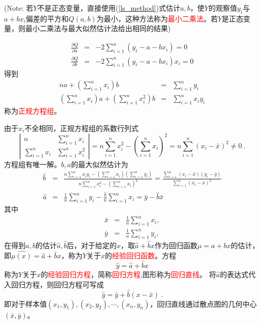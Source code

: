 \documentclass[12pt,a4paper]{article}
\begin{document}
(Note: 若$Y$不是正态变量，直接使用(\ref{ls_method})式估计$a, b$，使$Y$的观察值$y_i$与$a+bx_i$偏差的平方和$Q(a, b)$为最小，这种方法称为\textcolor{red}{最小二乘法}。若$Y$是正态变量，则最小二乘法与最大似然估计法给出相同的结果)

\begin{eqnarray}
\nonumber \frac{\partial Q}{\partial a} &=& -2\sum_{i=1}^n (y_i -a -bx_i) = 0 \\
\frac{\partial Q}{\partial b} &=& -2\sum_{i=1}^n (y_i -a -bx_i) x_i = 0
\end{eqnarray}
得到
\begin{eqnarray}
\nonumber na + \left(\sum_{i=1}^n x_i \right) b &=& \sum_{i=1}^n y_i \\
\left( \sum_{i=1}^n x_i \right) a + \left(\sum_{i=1}^n x^2_i \right) b &=& \sum_{i=1}^n x_i y_i 
\end{eqnarray}
称为\textcolor{red}{正规方程组}。

由于$x_i$不全相同，正规方程组的系数行列式
\begin{equation*}
\left|\begin{array}{cccc}   
    n  & \sum\limits_{i=1}^n x_i \\   
    \sum\limits_{i=1}^n x_i   & \sum\limits_{i=1}^n x_i^2
\end{array}\right|   
= n\sum_{i=1}^n x_i^2 -\left(\sum_{i=1}^n x_i \right)^2 = n\sum_{i=1}^n (x_i -\bar{x})^2 \neq 0 ~.
\end{equation*}
方程组有唯一解。$b, a$的最大似然估计为
\begin{eqnarray}
\nonumber \hat{b} &=& \frac{n\sum\limits_{i=1}^n x_i y_i -\left(\sum\limits_{i=1}^n x_i \right) \left(\sum\limits_{i=1}^n y_i\right)}{n\sum\limits_{i=1}^n x^2_i - \left(\sum\limits_{i=1}^n x_i \right)^2} =  \frac{ \sum\limits_{i=1}^n (x_i -\bar{x})(y_i -\bar{y} )}{\sum\limits_{i=1}^n (x_i -  \bar{x})^2 } \\
\hat{a} &=& \frac{1}{n} \sum_{i=1}^n y_i -\frac{\hat{b}}{n} \sum_{i=1}^n x_i = \bar{y} - \hat{b} \bar{x}
\end{eqnarray}
其中
\begin{eqnarray}
\nonumber \bar{x} &=& \frac{1}{n} \sum_{i=1}^n x_i , \\
\bar{y} &=& \frac{1}{n} \sum_{i=1}^n y_i ,
\end{eqnarray}
在得到$a, b$的估计$\hat{a}, \hat{b}$后，对于给定的$x$，取$\hat{a} + \hat{b} x$作为回归函数$\mu = a +bx$的估计，即$\widehat{\mu(x)} = \hat{a} + \hat{b} x$，称为$Y$关于$x$的\textcolor{red}{经验回归函数}。方程
\begin{equation}
 \hat{y} = \hat{a} + \hat{b} x
\end{equation}
称为$Y$关于$x$的\textcolor{red}{经验回归方程}，简称\textcolor{red}{回归方程},图形称为\textcolor{red}{回归直线}。
将$\hat{a}$的表达式代入回归方程，则回归方程可写成
\begin{equation}
\hat{y} = \bar{y} +\hat{b}(x-\bar{x}) ~.
\end{equation}
即对于样本值$(x_1, y_1), (x_2, y_2), \cdots, (x_n, y_n)$，回归直线通过散点图的几何中心$(\bar{x}, \bar{y})$。
\end{document}
